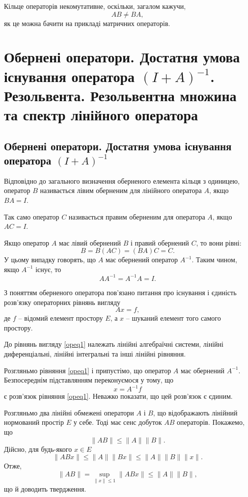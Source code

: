 \documentclass[14pt,twoside]{extreport}
\theoremstyle{mystyle}
\numberwithin{equation}{chapter}
\begin{document}
Кільце операторів некомутативне, оскільки, загалом кажучи,
\[
AB \neq BA,
\]
як це можна бачити на прикладі матричних операторів.

\chapter{Обернені оператори. Достатня умова існування оператора \texorpdfstring{$(I+A)^{-1}$}{(I+A)-1}. Резольвента. Резольвентна множина та спектр лінійного оператора}

\section{Обернені оператори. Достатня умова існування оператора \texorpdfstring{$(I+A)^{-1}$}{(I+A)-1}}

Відповідно до загального визначення оберненого елемента кільця з одиницею, оператор $B$ називається лівим оберненим для лінійного оператора $A$, якщо $BA =I$.

Так само оператор $C$ називається правим оберненим для оператора $A$, якщо $AC = I$.

Якщо оператор $A$ має лівий обернений $B$ і правий обернений $C$, то вони рівні:
\[
B=B(AC)=(BA)C=C.
\]
У цьому випадку говорять, що $A$ має обернений оператор $A^{-1}$. Таким чином, якщо $A^{-1}$ існує, то
\[
AA^{-1} = A^{-1}A = I.
\]

З поняттям оберненого оператора пов'язано питання про існування і єдиність розв'язку операторних рівнянь вигляду
\begin{equation}\label{opeq1}
Ax = f,
\end{equation}
де $f$ -- відомий елемент простору $E$, а $x$ -- шуканий елемент того самого простору.

До рівнянь вигляду \eqref{opeq1} належать лінійні алгебраїчні системи, лінійні диференціальні, лінійні інтегральні та інші лінійні рівняння.

Розгляньмо рівняння \eqref{opeq1} і припустімо, що оператор $A$ має обернений $A^{-1}$. Безпосереднім підставлянням переконуємося у тому, що
\begin{equation}
x=A^{-1}f
\end{equation}
є розв'язок рівняння \eqref{opeq1}. Неважко показати, що цей розв'язок є єдиним.

Розгляньмо два лінійні обмежені оператори $A$ і $B$, що відображають лінійний нормований простір $E$ у себе. Тоді має сенс добуток $AB$ операторів. Покажемо, що
\begin{equation}
\|AB\| \leqslant \|A\|\|B\|.
\end{equation}
Дійсно, для будь-якого $x\in E$
\begin{equation}
\|ABx\| \leqslant \|A\| \|Bx\| \leqslant \|A\|\|B\|\|x\|.
\end{equation}
Отже,
\[
\|AB\| = \sup_{\|x\| \leqslant 1}\|ABx\|\leqslant\|A\|\|B\|,
\]
що й доводить твердження.
\end{document}
